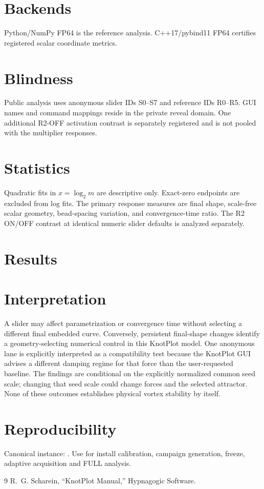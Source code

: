 \documentclass[11pt,a4paper]{article}
\begin{document}
\section{Backends}
Python/NumPy FP64 is the reference analysis. C++17/pybind11 FP64 certifies registered scalar coordinate metrics.
\section{Blindness}
Public analysis uses anonymous slider IDs S0--S7 and reference IDs R0--R5. GUI names and command mappings reside in the private reveal domain. One additional R2-OFF activation contrast is separately registered and is not pooled with the multiplier responses.
\section{Statistics}
Quadratic fits in $x=\log_2m$ are descriptive only. Exact-zero endpoints are excluded from log fits. The primary response measures are final shape, scale-free scalar geometry, bead-spacing variation, and convergence-time ratio. The R2 ON/OFF contrast at identical numeric slider defaults is analyzed separately.
\section{Results}
\section{Interpretation}
A slider may affect parametrization or convergence time without selecting a different final embedded curve. Conversely, persistent final-shape changes identify a geometry-selecting numerical control in this KnotPlot model. One anonymous lane is explicitly interpreted as a compatibility test because the KnotPlot GUI advises a different damping regime for that force than the user-requested baseline. The findings are conditional on the explicitly normalized common seed scale; changing that seed scale could change forces and the selected attractor. None of these outcomes establishes physical vortex stability by itself.
\section{Reproducibility}
Canonical instance: . Use  for install calibration, campaign generation, freeze, adaptive acquisition and FULL analysis.
\begin{thebibliography}{9}
 R.~G. Scharein, ``KnotPlot Manual,'' Hypnagogic Software.
\end{thebibliography}
\end{document}
